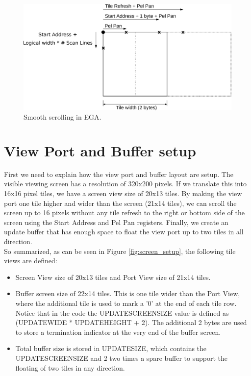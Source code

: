 \documentclass[book.tex]{subfiles}
\begin{document}
\begin{figure}[H]
\centering
\includegraphics[width=\textwidth]{imgs/drawings/Tile_Refresh.eps}
\caption{Smooth scrolling in EGA.}
\label{fig:tile_refresh}
\end{figure}

\begin{minipage}{\textwidth}
  
  \end{minipage}
  \label{ega_refresh}
  \par





\section{View Port and Buffer setup}
First we need to explain how the view port and buffer layout are setup. The visible viewing screen has a resolution of 320x200 pixels. If we translate this into 16x16 pixel tiles, we have a screen view size of 20x13 tiles. By making the view port one tile higher and wider than the screen (21x14 tiles), we can scroll the screen up to 16 pixels without any tile refresh to the right or bottom side of the screen using the Start Address and Pel Pan registers. Finally, we create an update buffer that has enough space to float the view port up to two tiles in all direction.\\

So summarized, as can be seen in Figure \ref{fig:screen_setup}, the following tile views are defined:
\begin{itemize}
\item Screen View size of 20x13 tiles and Port View size of 21x14 tiles.
\item Buffer screen size of 22x14 tiles. This is one tile wider than the Port View, where the additional tile is used to mark a '0' at the end of each tile row. Notice that in the code the UPDATESCREENSIZE value is defined as (UPDATEWIDE * UPDATEHEIGHT + 2). The additional 2 bytes are used to store a termination indicator at the very end of the buffer screen.
\item Total buffer size is stored in UPDATESIZE, which contains the UPDATESCREENSIZE and 2 two times a spare buffer to support the floating of two tiles in any direction. 
\end{itemize}
\par
 
\end{document}
